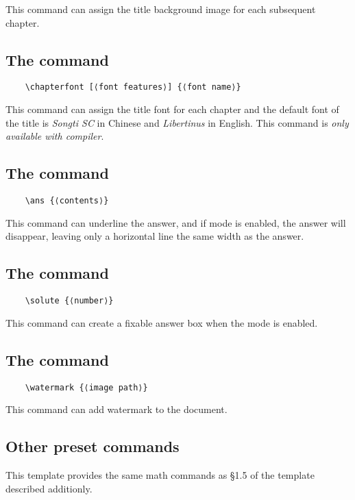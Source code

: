 \documentclass[ans]{litesolution}
\begin{document}
This command can assign the title background image for each subsequent chapter.

\subsection{The  command}
\begin{verbatim}
    \chapterfont [⟨font features⟩] {⟨font name⟩}
\end{verbatim}

This command can assign the title font for each chapter and the default font of the title is \emph{Songti SC} in Chinese and \emph{Libertinus} in English. This command is \emph{only available with  compiler}.

\subsection{The  command}
\begin{verbatim}
    \ans {⟨contents⟩}
\end{verbatim}
 
This command can underline the answer, and if mode  is enabled, the answer will disappear, leaving only a horizontal line the same width as the answer.

\subsection{The  command}
\begin{verbatim}
    \solute {⟨number⟩}
\end{verbatim}

This command can create a fixable answer box when the mode  is enabled.

\subsection{The  command}
\begin{verbatim}
    \watermark {⟨image path⟩}
\end{verbatim}

This command can add watermark to the document.

\subsection{Other preset commands}
This template provides the same math commands as \S 1.5 of the template  described additionly.
\end{document}
